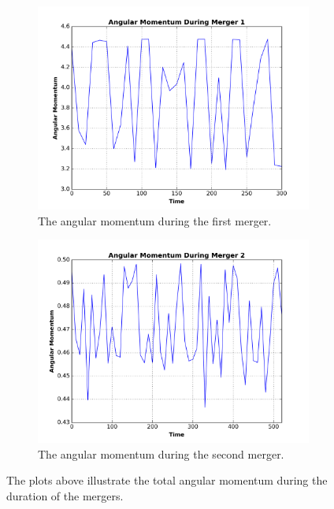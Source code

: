 \documentclass[12pt]{report}
\begin{document}
\begin{figure}[H]
\centering 
    \begin{subfigure}[b]{.475\textwidth}
        \centering
        \includegraphics[width=\linewidth]{angular_momentum_merg13.png}
        \caption[]%
        {{The angular momentum during the first merger.}}
    
        \label{fig:ang_merger1}
    \end{subfigure} %
    \hfill
    \begin{subfigure}[b]{.475\textwidth}
        \centering
        \includegraphics[width=\linewidth]{angular_momentum_merg21.png}
        \caption[]%
        {{The angular momentum during the second merger.}}
        \label{fig:ang_merger2} 
    \end{subfigure} %
    \caption[]
        {The plots above illustrate the total angular momentum during the duration of the mergers.} 
        \label{fig:angular_mmentum}
\end{figure}
\end{document}

